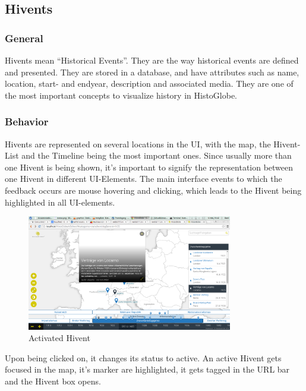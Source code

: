 \subsection{Hivents} %
\label{sec:hivents}
\subsubsection{General} %
\label{sub:general}
Hivents mean ``Historical Events''. They are the way historical events are defined and presented. They are stored in a database, and have attributes such as name, location, start- and endyear, description and associated media.
They are one of the most important concepts to visualize history in HistoGlobe.

\subsubsection{Behavior} %
\label{sub:behaviour}
Hivents are represented on several locations in the UI, with the map, the Hivent-List and the Timeline being the most important ones.
Since usually more than one Hivent is being shown, it's important to signify the representation between one Hivent in different UI-Elements.
The main interface events to which the feedback occurs are mouse hovering and clicking, which leads to the Hivent being highlighted in all UI-elements.

  \begin{figure}[here]
\begin{center}
  \includegraphics[width=0.8\textwidth]{graphics/activated_hivent.png}
  \end{center}

  \caption{Activated Hivent}
  \label{fig:activated_hivent}
\end{figure}

Upon being clicked on, it changes its status to active. An active Hivent gets focused in the map, it's marker are highlighted, it gets tagged in the URL bar and the Hivent box opens.

